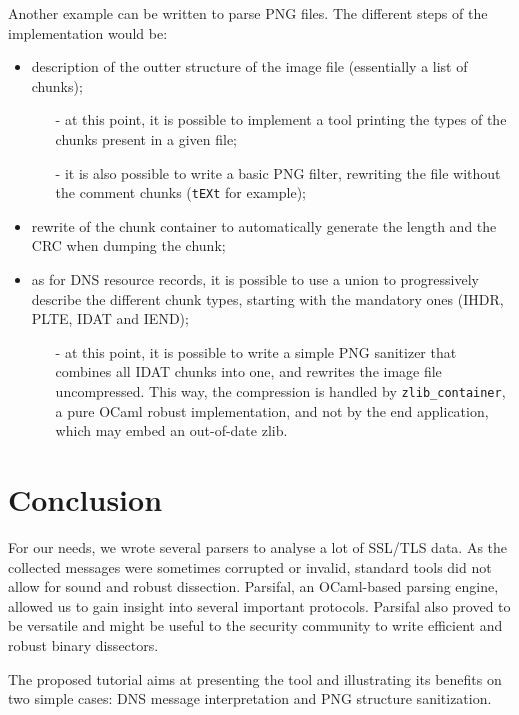 \documentclass{article}
\begin{document}
Another example can be written to parse PNG files. The different steps
of the implementation would be:
\begin{itemize}
\item description of the outter structure of the image file
  (essentially a list of chunks);
\begin{itemize}
\item[-] at this point, it is possible to implement a tool printing
  the types of the chunks present in a given file;
\item[-] it is also possible to write a basic PNG filter, rewriting
  the file without the comment chunks (\texttt{tEXt} for example);
\end{itemize}
\item rewrite of the chunk container to automatically generate the
  length and the CRC when dumping the chunk;
\item as for DNS resource records, it is possible to use a union to
  progressively describe the different chunk types, starting with the
  mandatory ones (IHDR, PLTE, IDAT and IEND);
\begin{itemize}
\item[-] at this point, it is possible to write a simple PNG sanitizer
  that combines all IDAT chunks into one, and rewrites the image file
  uncompressed. This way, the compression is handled by
  \texttt{zlib\_container}, a pure OCaml robust implementation, and
  not by the end application, which may embed an out-of-date zlib.
\end{itemize}
\end{itemize}



\section{Conclusion}

For our needs, we wrote several parsers to analyse a lot of SSL/TLS
data. As the collected messages were sometimes corrupted or invalid,
standard tools did not allow for sound and robust
dissection. Parsifal, an OCaml-based parsing engine, allowed us to
gain insight into several important protocols. Parsifal also proved to
be versatile and might be useful to the security community to write
efficient and robust binary dissectors.

The proposed tutorial aims at presenting the tool and illustrating its
benefits on two simple cases: DNS message interpretation and PNG
structure sanitization.




\end{document}
